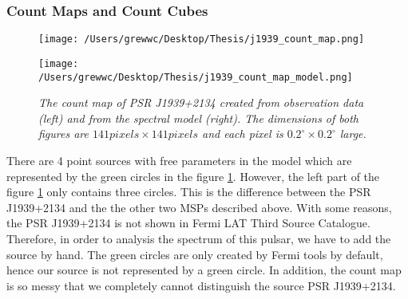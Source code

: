 \documentclass[12pt]{report}
\newcommand{\mycaption}[1]{\caption{\textit{\footnotesize #1}}}
\begin{document}
          \subsubsection{Count Maps and Count Cubes}
          \begin{figure}[!ht]
            \begin{center}
            \begin{minipage}{0.45\textwidth}
              \begin{center} 
                \texttt{[image: /Users/grewwc/Desktop/Thesis/j1939\_count\_map.png]}
              \end{center}
            \end{minipage}
            \begin{minipage}{0.45\textwidth}
              \begin{center}
                \texttt{[image: /Users/grewwc/Desktop/Thesis/j1939\_count\_map\_model.png]}
              \end{center}
            \end{minipage}
          \end{center}

            \centering
            \begin{minipage}{\textwidth}
              \mycaption{The count map of PSR J1939+2134 created from observation 
              data (\textsf{left}) and from the spectral model (\textsf{right}). The dimensions
              of both figures are $141 pixels \times 141 pixels$ and each pixel is 
              $0.2^{\circ}\times0.2^{\circ}$ large.}
              \label{fig: j1939_count_map}
            \end{minipage}
          \end{figure}
          \vspace{1cm}

          There are 4 point sources with free parameters in the model which are represented by the green 
          circles in the figure \ref{fig: j1939_count_map}.
          However, the left part of the figure \ref{fig: j1939_count_map} only contains three circles.
          This is the difference between the PSR J1939+2134 and the the other two MSPs described 
          above. With some reasons, the PSR J1939+2134 is not shown in Fermi LAT Third Source Catalogue.
          Therefore, in order to analysis the spectrum of this pulsar, we have to add the source 
          by hand. The green circles are only created by Fermi tools by default, hence our source is 
          not represented by a green circle. In addition, the count map is so messy that we completely 
          cannot distinguish the source PSR J1939+2134.
\end{document}
